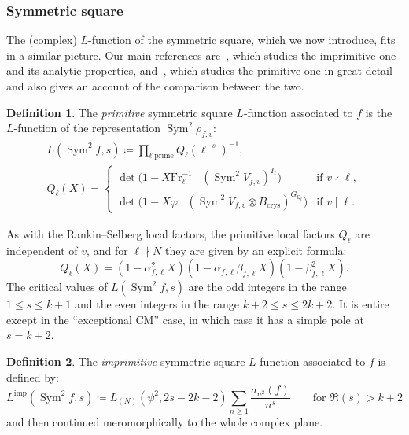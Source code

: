 \documentclass[11pt, a4paper, reqno]{amsart}
\theoremstyle{definition}
\newtheorem{definition}{Definition}[subsection]
\theoremstyle{plain}
\theoremstyle{remark}
\DeclareMathOperator{\Sym}{Sym}
\newcommand{\numberset}{\mathbb}
\newcommand{\Q}{\numberset{Q}}
\newcommand{\Bcrys}{B_{\mathrm{crys}}}
\renewcommand{\phi}{\varphi}
\newcommand{\Frob}{\mathrm{Fr}}
\newcommand{\Limp}{L^{\mathrm{imp}}}
\renewcommand{\ge}{\geqslant}
\renewcommand{\geq}{\ge}
\renewcommand{\le}{\leqslant}
\renewcommand{\leq}{\le}
\begin{document}
  \subsubsection*{Symmetric square} The (complex) $L$-function of the symmetric square, which we now introduce, fits in a similar picture. Our main references are~\cite{shimura75}, which studies the imprimitive one and its analytic properties, and~\cite{schmidt88}, which studies the primitive one in great detail and also gives an account of the comparison between the two.

  \begin{definition}
   The \emph{primitive} symmetric square $L$-function associated to $f$ is the $L$-function of the representation $\Sym^2 \rho_{f,v}$:
   \begin{gather*}
    L(\Sym^2 f,s) \coloneqq \prod_{\ell \; \text{prime}} Q_\ell(\ell^{-s})^{-1}, \\
    Q_\ell(X) =
    \begin{cases}
     \det\bigl(1 - X\Frob_\ell^{-1} \mid (\Sym^2 V_{f,v})^{I_\ell}\bigr) &\text{if } v \nmid \ell,  \\
     \det\bigl(1 - X\phi \mid (\Sym^2 V_{f,v}\otimes \Bcrys)^{G_{\Q_\ell}}\bigr) &\text{if } v\mid \ell.
    \end{cases}
   \end{gather*}
  \end{definition}

  As with the Rankin--Selberg local factors, the primitive local factors $Q_\ell$ are independent of $v$, and for $\ell \nmid N$ they are given by an explicit formula:
  \[
   Q_\ell(X) = (1-\alpha_{f,\ell}^2 X)(1-\alpha_{f,\ell}\beta_{f,\ell}X)(1-\beta_{f,\ell}^2 X).
  \]
  The critical values of $L(\Sym^2 f,s)$ are the odd integers in the range $1 \leq s \leq k+1$ and the even integers in the range $k+2 \leq s \leq 2k+2$. It is entire except in the ``exceptional CM'' case, in which case it has a simple pole at $s = k + 2$.

  \begin{definition}
   The \emph{imprimitive} symmetric square $L$-function associated to $f$ is defined by:
   \[
    \Limp(\Sym^2 f,s) \coloneqq L_{(N)}(\psi^2, 2s-2k-2)\sum_{n\geq 1} \frac{a_{n^2}(f)}{n^s} \qquad \text{for $\Re(s) > k + 2$}
   \]
   and then continued meromorphically to the whole complex plane.
  \end{definition}
\end{document}
